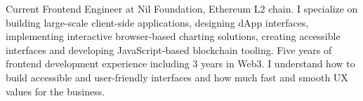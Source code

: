 

\begin{cvparagraph}

Current Frontend Engineer at Nil Foundation, Ethereum L2 chain.
I specialize on building large-scale client-side applications, designing dApp interfaces,
implementing interactive browser-based charting solutions, creating accessible interfaces
and developing JavaScript-based blockchain tooling.
\newline
Five years of frontend development experience including 3 years in Web3.
\newline
I understand how to build accessible and user-friendly interfaces and how much fast and smooth UX values for the business.
\end{cvparagraph}
